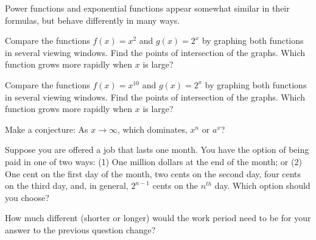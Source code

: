 \begin{activity}\label{A:0.6.1}
Power functions and exponential functions appear somewhat similar in their formulas, but behave differently in many ways.  

\ba
	\item Compare the functions $f(x)=x^2$ and $g(x)=2^x$ by graphing both functions in several viewing windows.  Find the points of intersection of the graphs.  Which function grows more rapidly when $x$ is large?
    \item Compare the functions $f(x)=x^{10}$ and $g(x)=2^x$ by graphing both functions in several viewing windows.  Find the points of intersection of the graphs.  Which function grows more rapidly when $x$ is large?
	\item Make a conjecture: As $x\to\infty$, which dominates, $x^n$ or $a^x$?
	\item Suppose you are offered a job that lasts one month.  You have the option of being paid in one of two ways: (1) One million dollars at the end of the month; or (2) One cent on the first day of the month, two cents on the second day, four cents on the third day, and, in general, $2^{n-1}$ cents on the $n^{th}$ day.  Which option should you choose?
	\item How much different (shorter or longer) would the work period need to be for your answer to the previous question change?
        \ea

\end{activity}\aftera
